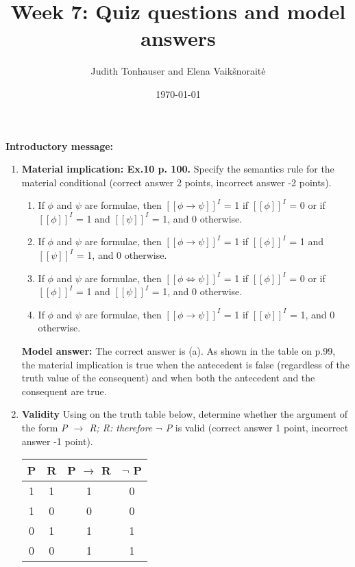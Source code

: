 \documentclass[a4,11pt]{article}
\title{Week 7: Quiz questions and model answers}
\author{Judith Tonhauser and Elena Vaik\v snorait\.{e} }
\date{\today}
\newcommand{\6}{\mbox{$[\hspace*{-.6mm}[$}}
\newcommand{\9}{\mbox{$]\hspace*{-.6mm}]$}}
\begin{document}
\maketitle

{\bf Introductory message:} 

\begin{enumerate}[leftmargin = 12pt]

\item {\bf  Material implication: Ex.10 p. 100.} Specify the semantics rule for the material conditional (correct answer 2 points, incorrect answer -2 points).

\begin{enumerate}
\item If $\phi$ and $\psi$ are formulae, then $[[\phi \to \psi]]^{I}$ = 1 if $[[\phi]]^{I}$ = 0 or if $[[\phi]]^{I}$ = 1 and $[[\psi]]^{I}$ = 1, and 0 otherwise. 
\item If $\phi$ and $\psi$ are formulae, then $[[\phi \to \psi]]^{I}$ = 1 if $[[\phi]]^{I}$ = 1 and $[[\psi]]^{I}$ = 1, and 0 otherwise. 
\item If $\phi$ and $\psi$ are formulae, then $[[\phi \iff \psi]]^{I}$ = 1 if $[[\phi]]^{I}$ = 0 or if $[[\phi]]^{I}$ = 1 and $[[\psi]]^{I}$ = 1, and 0 otherwise. 
\item If $\phi$ and $\psi$ are formulae,  then $[[\phi \to \psi]]^{I}$ = 1 if $[[\psi]]^{I}$ = 1, and 0 otherwise. 
\end{enumerate}

{ \bf Model answer:}  The correct answer is (a). As shown in the table on p.99, the material implication is true when the antecedent is false (regardless of the truth value of the consequent) and when both the antecedent and the consequent are true.

 
\item {\bf Validity} Using on the truth table below, determine whether the argument of the form \textit{ P $\to$ R; R: therefore $\neg$ P} is valid (correct answer 1 point, incorrect answer -1 point).


\begin{tabular}{c | c | c| c }
\hline \hline
P & R & P $\to$ R  & $\neg$ P \\
\hline
1 & 1 & 1 & 0 \\
1 & 0 & 0 & 0 \\
0 & 1 & 1 & 1 \\
0 & 0 & 1 & 1 \\
\hline \hline
\end{tabular}


\end{enumerate}
\end{document}
